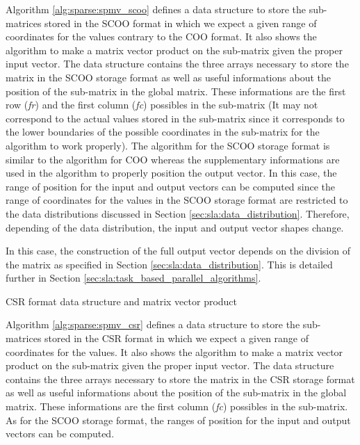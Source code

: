 Algorithm \ref{alg:sparse:spmv_scoo} defines a data structure to store the sub-matrices stored in the SCOO format in which we expect a given range of coordinates for the values contrary to the COO format.
It also shows the algorithm to make a matrix vector product on the sub-matrix given the proper input vector.
The data structure contains the three arrays necessary to store the matrix in the SCOO storage format as well as useful informations about the position of the sub-matrix in the global matrix.
These informations are the first row (\textit{fr}) and the first column (\textit{fc}) possibles in the sub-matrix (It may not correspond to the actual values stored in the sub-matrix since it corresponds to the lower boundaries of the possible coordinates in the sub-matrix for the algorithm to work properly).
The algorithm for the SCOO storage format is similar to the algorithm for COO whereas the supplementary informations are used in the algorithm to properly position the output vector.
In this case, the range of position for the input and output vectors can be computed since the range of coordinates for the values in the SCOO storage format are restricted to the data distributions discussed in Section \ref{sec:sla:data_distribution}.
Therefore, depending of the data distribution, the input and output vector shapes change.

In this case, the construction of the full output vector depends on the division of the matrix as specified in Section \ref{sec:sla:data_distribution}.
This is detailed further in Section \ref{sec:sla:task_based_parallel_algorithms}.


\begin{algorithm}[h]
	\DontPrintSemicolon
	\SetAlgoVlined
	\caption{CSR format data structure and matrix vector product\label{alg:sparse:spmv_csr}}

	\;
\end{algorithm}

Algorithm \ref{alg:sparse:spmv_csr} defines a data structure to store the sub-matrices stored in the CSR format in which we expect a given range of coordinates for the values.
It also shows the algorithm to make a matrix vector product on the sub-matrix given the proper input vector.
The data structure contains the three arrays necessary to store the matrix in the CSR storage format as well as useful informations about the position of the sub-matrix in the global matrix.
These informations are the first column (\textit{fc}) possibles in the sub-matrix.
As for the SCOO storage format, the ranges of position for the input and output vectors can be computed.


